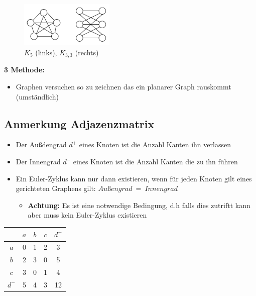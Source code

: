 \begin{figure}[h]
\centering
\includegraphics[width=0.4\textwidth]{graphics/graph_planar.png}
\caption*{$K_5$ (links), $K_{3,3}$ (rechts)}
\end{figure}

\textbf{3 Methode:}

\begin{itemize}
\item Graphen versuchen so zu zeichnen das ein planarer Graph rauskommt (umständlich)
\end{itemize}

\newpage

\subsection{Anmerkung Adjazenzmatrix}

\begin{itemize}
\item Der Außdengrad $d^+$ eines Knoten ist die Anzahl Kanten ihn verlassen
\item Der Innengrad $d^-$ eines Knoten ist die Anzahl Kanten die zu ihn führen
\item Ein Euler-Zyklus kann nur dann existieren, wenn für jeden Knoten gilt eines gerichteten Graphens gilt: $Außengrad \ = \ Innengrad$
\begin{itemize}
\item \textbf{Achtung:} Es ist eine notwendige Bedingung, d.h falls dies zutriftt kann aber muss kein Euler-Zyklus existieren
\end{itemize} 
\end{itemize}

\begin{table}[h]
\centering
\begin{tabular}{c|ccc|c}
& $a$ & $b$ & $c$ & $d^+$\\
\hline
$a$ & 0 & 1 & 2 & 3\\
$b$ & 2 & 3 & 0 & 5\\
$c$ & 3 & 0 & 1 & 4\\
\hline
$d^-$ & 5 & 4 & 3 & 12
\end{tabular}
\end{table}